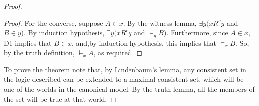 \documentclass[11pt]{article}
\begin{document}
\begin{proof}
\begin{proof}
For the converse, suppose $A{\in}x$. By the witness lemma, $\exists y (xR^cy$ and $B{\in}y)$. By induction hypothesis, $\exists y( xR^cy$ and ${\models_y}B)$. Furthermore, since $A{\in}x$, D1 implies that $B{\in}x$, and,by induction hypothesis, this implies that $\models _x B$. So, by the truth definition, $\models _x A$, as required.
\end{proof}
To prove the theorem note that, by Lindenbaum's lemma, any consistent set in the logic described can be extended to a maximal consistent set, which will be one of the worlds in the canonical model. By the truth lemma, all the members of the set will be true at that world. 
\end{proof}
{}

\end{document}
